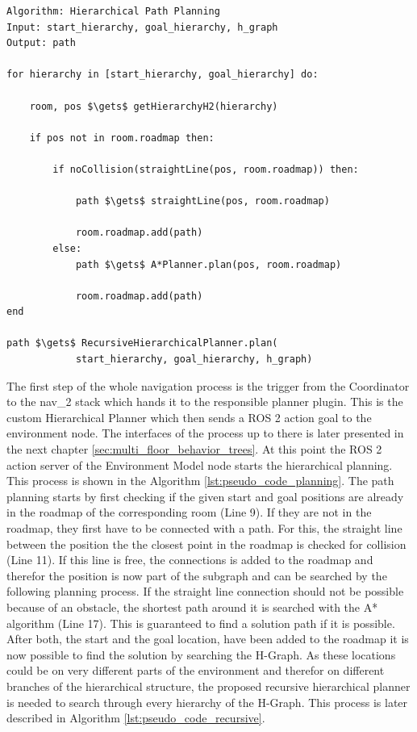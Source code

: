 \begin{lstlisting}[float=h]
Algorithm: Hierarchical Path Planning
Input: start_hierarchy, goal_hierarchy, h_graph
Output: path

for hierarchy in [start_hierarchy, goal_hierarchy] do:

    room, pos $\gets$ getHierarchyH2(hierarchy)
    
    if pos not in room.roadmap then:
    
        if noCollision(straightLine(pos, room.roadmap)) then:
        
            path $\gets$ straightLine(pos, room.roadmap)
            
            room.roadmap.add(path)
        else:
            path $\gets$ A*Planner.plan(pos, room.roadmap)
            
            room.roadmap.add(path)
end

path $\gets$ RecursiveHierarchicalPlanner.plan(
            start_hierarchy, goal_hierarchy, h_graph)

\end{lstlisting}

The first step of the whole navigation process is the trigger from the Coordinator to the \gls{nav_2} stack which hands it to the responsible planner plugin. This is the custom Hierarchical Planner which then sends a ROS 2 action goal to the environment node. The interfaces of the process up to there is later presented in the next chapter \ref{sec:multi_floor_behavior_trees}. At this point the ROS 2 action server of the Environment Model node starts the hierarchical planning. This process is shown in the Algorithm \ref{lst:pseudo_code_planning}. The path planning starts by first checking if the given start and goal positions are already in the roadmap of the corresponding room (Line 9). If they are not in the roadmap, they first have to be connected with a path. For this, the straight line between the position the the closest point in the roadmap is checked for collision (Line 11). If this line is free, the connections is added to the roadmap and therefor the position is now part of the subgraph and can be searched by the following planning process. If the straight line connection should not be possible because of an obstacle, the shortest path around it is searched with the A* algorithm (Line 17). This is guaranteed to find a solution path if it is possible. After both, the start and the goal location, have been added to the roadmap it is now possible to find the solution by searching the H-Graph. As these locations could be on very different parts of the environment and therefor on different branches of the hierarchical structure, the proposed recursive hierarchical planner is needed to search through every hierarchy of the H-Graph. This process is later described in Algorithm \ref{lst:pseudo_code_recursive}.

